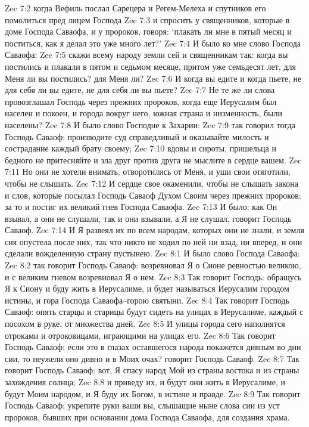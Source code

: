 Zec 7:2  когда Вефиль послал Сарецера и Регем-Мелеха и спутников его помолиться пред лицем Господа
Zec 7:3  и спросить у священников, которые в доме Господа Саваофа, и у пророков, говоря: `плакать ли мне в пятый месяц и поститься, как я делал это уже много лет?'
Zec 7:4  И было ко мне слово Господа Саваофа:
Zec 7:5  скажи всему народу земли сей и священникам так: когда вы постились и плакали в пятом и седьмом месяце, притом уже семьдесят лет, для Меня ли вы постились? для Меня ли?
Zec 7:6  И когда вы едите и когда пьете, не для себя ли вы едите, не для себя ли вы пьете?
Zec 7:7  Не те же ли слова провозглашал Господь через прежних пророков, когда еще Иерусалим был населен и покоен, и города вокруг него, южная страна и низменность, были населены?
Zec 7:8  И было слово Господне к Захарии:
Zec 7:9  так говорил тогда Господь Саваоф: производите суд справедливый и оказывайте милость и сострадание каждый брату своему;
Zec 7:10  вдовы и сироты, пришельца и бедного не притесняйте и зла друг против друга не мыслите в сердце вашем.
Zec 7:11  Но они не хотели внимать, отворотились от Меня, и уши свои отяготили, чтобы не слышать.
Zec 7:12  И сердце свое окаменили, чтобы не слышать закона и слов, которые посылал Господь Саваоф Духом Своим через прежних пророков; за то и постиг их великий гнев Господа Саваофа.
Zec 7:13  И было: как Он взывал, а они не слушали, так и они взывали, а Я не слушал, говорит Господь Саваоф.
Zec 7:14  И Я развеял их по всем народам, которых они не знали, и земля сия опустела после них, так что никто не ходил по ней ни взад, ни вперед, и они сделали вожделенную страну пустынею.
Zec 8:1  И было слово Господа Саваофа:
Zec 8:2  так говорит Господь Саваоф: возревновал Я о Сионе ревностью великою, и с великим гневом возревновал Я о нем.
Zec 8:3  Так говорит Господь: обращусь Я к Сиону и буду жить в Иерусалиме, и будет называться Иерусалим городом истины, и гора Господа Саваофа--горою святыни.
Zec 8:4  Так говорит Господь Саваоф: опять старцы и старицы будут сидеть на улицах в Иерусалиме, каждый с посохом в руке, от множества дней.
Zec 8:5  И улицы города сего наполнятся отроками и отроковицами, играющими на улицах его.
Zec 8:6  Так говорит Господь Саваоф: если это в глазах оставшегося народа покажется дивным во дни сии, то неужели оно дивно и в Моих очах? говорит Господь Саваоф.
Zec 8:7  Так говорит Господь Саваоф: вот, Я спасу народ Мой из страны востока и из страны захождения солнца;
Zec 8:8  и приведу их, и будут они жить в Иерусалиме, и будут Моим народом, и Я буду их Богом, в истине и правде.
Zec 8:9  Так говорит Господь Саваоф: укрепите руки ваши вы, слышащие ныне слова сии из уст пророков, бывших при основании дома Господа Саваофа, для создания храма.
